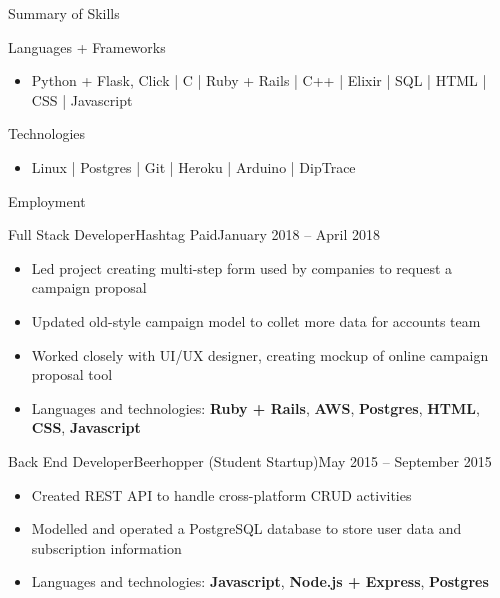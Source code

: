 \documentclass[calibri]{mcdowellcv}
\begin{document}
    \makeheader

    \begin{cvsection}{\Large{Summary of Skills}}
        \begin{cvsubsection}{Languages + Frameworks}{}{}
            \begin{itemize}
                \item Python + Flask, Click | C | Ruby + Rails | C++ | Elixir | SQL | HTML | CSS | Javascript
            \end{itemize}
        \end{cvsubsection}
        \begin{cvsubsection}{Technologies}{}{}
            \begin{itemize}
                \item Linux | Postgres | Git | Heroku | Arduino | DipTrace
            \end{itemize}
        \end{cvsubsection}
    \end{cvsection}

    \begin{cvsection}{\Large{Employment}}
        \begin{cvsubsection}{Full Stack Developer}{Hashtag Paid}{January 2018 -- April 2018}
            \begin{itemize}
                \item Led project creating multi-step form used by companies to request a campaign proposal
                \item Updated old-style campaign model to collet more data for accounts team
                \item Worked closely with UI/UX designer, creating mockup of online campaign proposal tool
                \item Languages and technologies: \textbf{Ruby + Rails}, \textbf{AWS}, \textbf{Postgres}, \textbf{HTML}, \textbf{CSS}, \textbf{Javascript}
            \end{itemize}
        \end{cvsubsection}

        \begin{cvsubsection}{Back End Developer}{Beerhopper (Student Startup)}{May 2015 -- September 2015}
            \begin{itemize}
                \item Created REST API to handle cross-platform CRUD activities
                \item Modelled and operated a PostgreSQL database to store user data and subscription information
                \item Languages and technologies: \textbf{Javascript}, \textbf{Node.js + Express}, \textbf{Postgres}
            \end{itemize}
        \end{cvsubsection}
    \end{cvsection}
\end{document}
